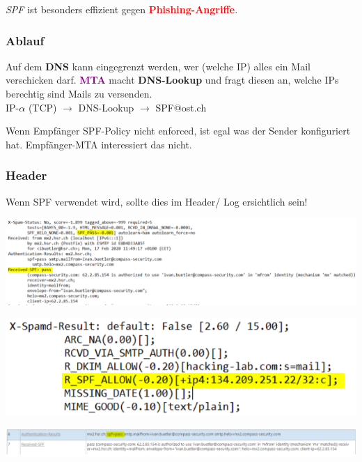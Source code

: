 \textit{SPF} ist besonders effizient gegen \textcolor{red}{\textbf{Phishing-Angriffe}}.

\subsubsection{Ablauf}
Auf dem \textbf{DNS} kann eingegrenzt werden, wer (welche IP) alles ein Mail verschicken darf.
\textcolor{purple}{\textbf{MTA}} macht \textbf{DNS-Lookup} und fragt diesen an, welche IPs berechtig sind Mails zu versenden.\\
IP-$\alpha$ (TCP) $\rightarrow$ DNS-Lookup $\rightarrow$ SPF@ost.ch

Wenn Empfänger SPF-Policy nicht enforced, ist egal was der Sender konfiguriert hat. Empfänger-MTA interessiert das nicht.\\

\subsubsection{Header}
Wenn SPF verwendet wird, sollte dies im Header/ Log ersichtlich sein!
\begin{center}
    \vspace{-8pt}
    \includegraphics[width=1.0\linewidth]{./img/07-mail_security/spf}
    \vspace{-8pt}
\end{center}
\begin{center}
    \vspace{-8pt}
    \includegraphics[width=.6\linewidth]{./img/07-mail_security/spf2}
    \vspace{-8pt}
\end{center}
\begin{center}
    \vspace{-8pt}
    \includegraphics[width=1.0\linewidth]{./img/07-mail_security/spf3}
    \vspace{-8pt}
\end{center}


